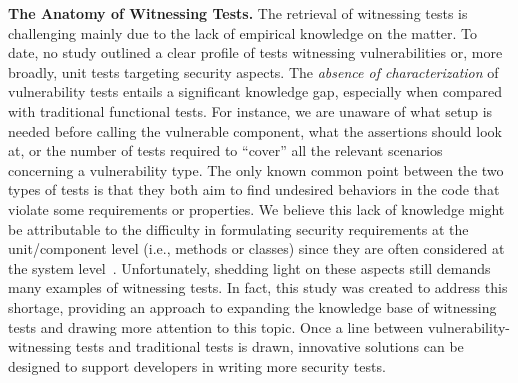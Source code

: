 \textbf{The Anatomy of Witnessing Tests.}
The retrieval of witnessing tests is challenging mainly due to the lack of empirical knowledge on the matter.
To date, no study outlined a clear profile of tests witnessing vulnerabilities or, more broadly, unit tests targeting security aspects.
%
The \textit{absence of characterization} of vulnerability tests entails a significant knowledge gap, especially when compared with traditional functional tests.
For instance, we are unaware of what setup is needed before calling the vulnerable component, what the assertions should look at, or the number of tests required to ``cover'' all the relevant scenarios concerning a vulnerability type.
%
The only known common point between the two types of tests is that they both aim to find undesired behaviors in the code that violate some requirements or properties.
We believe this lack of knowledge might be attributable to the difficulty in formulating security requirements at the unit/component level (i.e., methods or classes) since they are often considered at the system level~\cite{Mai:issre18:sec:requirements,felderer:2016:survey:sectests}.
%
Unfortunately, shedding light on these aspects still demands many examples of witnessing tests.
In fact, this study was created to address this shortage, providing an approach to expanding the knowledge base of witnessing tests and drawing more attention to this topic.
%
Once a line between vulnerability-witnessing tests and traditional tests is drawn, innovative solutions can be designed to support developers in writing more security tests.